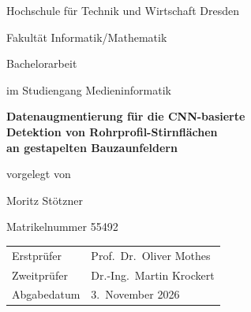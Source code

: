 %

\newcommand{\platzhalter}[1]{\textcolor{red!70!black}{[#1]}}

\begin{titlepage}
\centering

{\large Hochschule für Technik und Wirtschaft Dresden\par}
\vspace{0.3em}
{\large Fakultät Informatik/Mathematik\par}

\vspace*{2.2cm}

{\large Bachelorarbeit\par}
im Studiengang Medieninformatik
\vspace{1.6cm}

{\LARGE\bfseries Datenaugmentierung für die CNN-basierte\\[0.3em]
Detektion von Rohrprofil-Stirnflächen\\[0.3em]
an gestapelten Bauzaunfeldern\par}

\vspace{2.4cm}

{\large vorgelegt von\par}
\vspace{0.4em}
{\Large Moritz Stötzner\par}
\vspace{0.4em}
Matrikelnummer 55492

\vfill

\begin{tabular}{@{}ll@{}}
Erstprüfer\hspace{1.5em}  & Prof.\ Dr.\ Oliver Mothes \\[0.3em]
Zweitprüfer               & Dr.-Ing.\ Martin Krockert \\[0.8em]
Abgabedatum               & 3.\ November 2026 \\
\end{tabular}

\vspace{1.2cm}

\end{titlepage}
